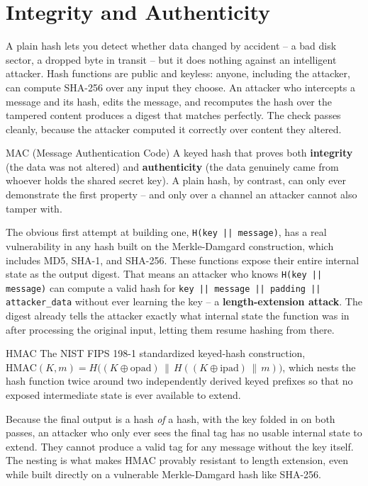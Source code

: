 \section{Integrity and Authenticity}

A plain hash lets you detect whether data changed by accident -- a bad disk sector, a dropped byte
in transit -- but it does nothing against an intelligent attacker. Hash functions are public
and keyless: anyone, including the attacker, can compute SHA-256 over any input they choose. An
attacker who intercepts a message and its hash, edits the message, and recomputes the hash over the
tampered content produces a digest that matches perfectly. The check passes cleanly, because the
attacker computed it correctly over content they altered.

\begin{definition}{MAC (Message Authentication Code)}
A keyed hash that proves both \textbf{integrity} (the data was not altered) and
\textbf{authenticity} (the data genuinely came from whoever holds the shared secret key). A plain
hash, by contrast, can only ever demonstrate the first property -- and only over a channel an
attacker cannot also tamper with.
\end{definition}

The obvious first attempt at building one, \texttt{H(key || message)}, has a real vulnerability in
any hash built on the Merkle-Damgard construction, which includes MD5, SHA-1, and SHA-256. These
functions expose their entire internal state as the output digest. That means an attacker who
knows \texttt{H(key || message)} can compute a valid hash for \texttt{key || message || padding ||
attacker\_data} without ever learning the key -- a \textbf{length-extension attack}. The digest
already tells the attacker exactly what internal state the function was in after processing the
original input, letting them resume hashing from there.

\begin{definition}{HMAC}
The NIST FIPS 198-1 standardized keyed-hash construction,
$\mathrm{HMAC}(K, m) = H\big((K \oplus \mathrm{opad}) \,\|\, H((K \oplus \mathrm{ipad}) \,\|\, m)\big)$,
which nests the hash function twice around two independently derived keyed prefixes so that no
exposed intermediate state is ever available to extend.
\end{definition}

Because the final output is a hash \emph{of} a hash, with the key folded in on both passes, an
attacker who only ever sees the final tag has no usable internal state to extend. They cannot
produce a valid tag for any message without the key itself. The nesting is what makes HMAC provably
resistant to length extension, even while built directly on a vulnerable Merkle-Damgard hash like
SHA-256.

